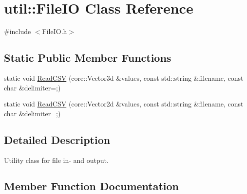 \hypertarget{classutil_1_1FileIO}{}\section{util\+:\+:File\+IO Class Reference}
\label{classutil_1_1FileIO}


{\ttfamily \#include $<$File\+I\+O.\+h$>$}

\subsection*{Static Public Member Functions}
\begin{DoxyCompactItemize}
\item 
static void \hyperlink{classutil_1_1FileIO_acfce3977f435f2b024984da05408dfb4}{Read\+C\+SV} (core\+::\+Vector3d \&values, const std\+::string \&filename, const char \&delimiter=\textquotesingle{};\textquotesingle{})
\item 
static void \hyperlink{classutil_1_1FileIO_a5d145cb872989165f76d00c343170bc5}{Read\+C\+SV} (core\+::\+Vector2d \&values, const std\+::string \&filename, const char \&delimiter=\textquotesingle{};\textquotesingle{})
\end{DoxyCompactItemize}


\subsection{Detailed Description}
Utility class for file in-\/ and output. 

\subsection{Member Function Documentation}
